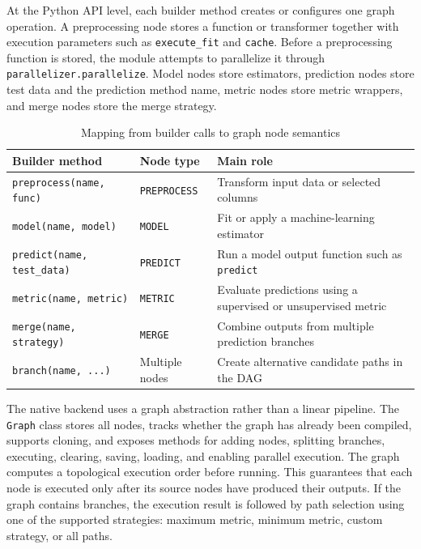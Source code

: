 At the Python API level, each builder method creates or configures one graph
operation. A preprocessing node stores a function or transformer together with
execution parameters such as \texttt{execute\_fit} and \texttt{cache}. Before a
preprocessing function is stored, the module attempts to parallelize it through
\texttt{parallelizer.parallelize}. Model nodes store estimators, prediction nodes
store test data and the prediction method name, metric nodes store metric
wrappers, and merge nodes store the merge strategy.

\begin{table}[H]
\centering
\caption{Mapping from builder calls to graph node semantics}
\begin{tabular}{lll}
\toprule
Builder method & Node type & Main role \\
\midrule
\texttt{preprocess(name, func)} & \texttt{PREPROCESS} & Transform input data or selected columns \\
\texttt{model(name, model)} & \texttt{MODEL} & Fit or apply a machine-learning estimator \\
\texttt{predict(name, test\_data)} & \texttt{PREDICT} & Run a model output function such as \texttt{predict} \\
\texttt{metric(name, metric)} & \texttt{METRIC} & Evaluate predictions using a supervised or unsupervised metric \\
\texttt{merge(name, strategy)} & \texttt{MERGE} & Combine outputs from multiple prediction branches \\
\texttt{branch(name, ...)} & Multiple nodes & Create alternative candidate paths in the DAG \\
\bottomrule
\end{tabular}
\end{table}

The native backend uses a graph abstraction rather than a linear pipeline. The
\texttt{Graph} class stores all nodes, tracks whether the graph has already been
compiled, supports cloning, and exposes methods for adding nodes, splitting
branches, executing, clearing, saving, loading, and enabling parallel execution.
The graph computes a topological execution order before running. This guarantees
that each node is executed only after its source nodes have produced their
outputs. If the graph contains branches, the execution result is followed by path
selection using one of the supported strategies: maximum metric, minimum metric,
custom strategy, or all paths.

